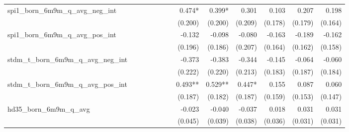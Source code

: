 \begin{tabular}{lrrrrrrrrrrrr}
spi1\_born\_6m9m\_q\_avg\_neg\_int          &              &              &              &              &              &              &       0.474* &       0.399* &        0.301 &        0.103 &        0.207 &        0.198 \\ 
                                            &              &              &              &              &              &              &      (0.200) &      (0.200) &      (0.209) &      (0.178) &      (0.179) &      (0.164) \\ 
spi1\_born\_6m9m\_q\_avg\_pos\_int          &              &              &              &              &              &              &       -0.132 &       -0.098 &       -0.080 &       -0.163 &       -0.189 &       -0.162 \\ 
                                            &              &              &              &              &              &              &      (0.196) &      (0.186) &      (0.207) &      (0.164) &      (0.162) &      (0.158) \\ 
stdm\_t\_born\_6m9m\_q\_avg\_neg\_int       &              &              &              &              &              &              &       -0.373 &       -0.383 &       -0.344 &       -0.145 &       -0.064 &       -0.060 \\ 
                                            &              &              &              &              &              &              &      (0.222) &      (0.220) &      (0.213) &      (0.183) &      (0.187) &      (0.184) \\ 
stdm\_t\_born\_6m9m\_q\_avg\_pos\_int       &              &              &              &              &              &              &      0.493** &      0.529** &       0.447* &        0.155 &        0.087 &        0.060 \\ 
                                            &              &              &              &              &              &              &      (0.187) &      (0.182) &      (0.187) &      (0.159) &      (0.153) &      (0.147) \\ 
hd35\_born\_6m9m\_q\_avg                    &              &              &              &              &              &              &       -0.023 &       -0.040 &       -0.037 &        0.018 &        0.031 &        0.031 \\ 
                                            &              &              &              &              &              &              &      (0.045) &      (0.039) &      (0.038) &      (0.036) &      (0.031) &      (0.031) \\ 

\end{tabular}
